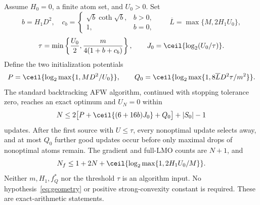 \begin{theorem}
\label{thm:zerofinite}
Assume $H_0=0$, a finite atom set, and $U_0>0$. Set
\[
 b=H_1D^2,\quad
 c_b=\begin{cases}\sqrt b\coth\sqrt b,&b>0,\\1,&b=0,\end{cases}
 \qquad \overline L=\max\{M,2H_1U_0\},
\]
\begin{equation}\label{eq:zerothreshold}
 \tau=\min\left\{\frac{U_0}2,
       \frac{m}{4(1+b+c_b)}\right\},\qquad
 J_0=\ceil{\log_2(U_0/\tau)}.
\end{equation}
Define the two initialization potentials
\[
 P=\ceil{\log_2\max\{1,MD^2/U_0\}},\qquad
 Q_0=\ceil{\log_2\max\{1,8\overline L D^2\tau/m^2\}}.
\]
The standard backtracking AFW algorithm, continued with stopping
tolerance zero, reaches an exact optimum and $U_N=0$ within
\begin{equation}\label{eq:zerofinite}
 N\le2\big[P+\ceil{(6+16b)J_0}+Q_0\big]+|S_0|-1
\end{equation}
updates. After the first source with $U\le\tau$, every nonoptimal
update selects away, and at most $Q_0$ further good updates occur
before only maximal drops of nonoptimal atoms remain.
The gradient and full-LMO counts are $N+1$, and
\[
 N_f\le1+2N+\ceil{\log_2\max\{1,2H_1U_0/M\}}.
\]
Neither $m,H_1,f_Q^*$ nor the threshold $\tau$ is an algorithm input.
No hypothesis~\eqref{eq:geometry} or positive strong-convexity
constant is required. These are exact-arithmetic statements.
\end{theorem}
